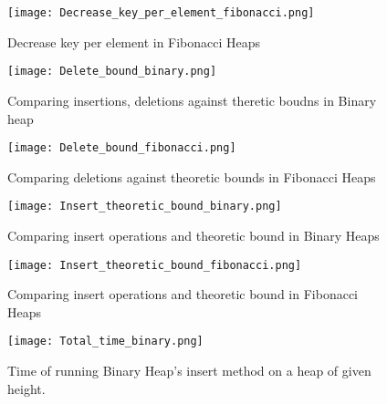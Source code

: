 \documentclass[a4paper,10pt]{article}
\begin{document}
\begin{figure}[h]
    \label{deckeyperelmfib}
  \texttt{[image: Decrease\_key\_per\_element\_fibonacci.png]}
  \caption{Decrease key per element in Fibonacci Heaps}
\end{figure}

\begin{figure}[h]
    \label{delboundbin}
  \texttt{[image: Delete\_bound\_binary.png]}
  \caption{Comparing insertions, deletions against theretic boudns in Binary heap}
\end{figure}

\begin{figure}[h]
    \label{delboundfib}
  \texttt{[image: Delete\_bound\_fibonacci.png]}
  \caption{Comparing deletions against theoretic bounds in Fibonacci Heaps}
\end{figure}

\begin{figure}[h]
    \label{instheoreticboundbin}
  \texttt{[image: Insert\_theoretic\_bound\_binary.png]}
  \caption{Comparing insert operations and theoretic bound in Binary Heaps}
\end{figure}

\begin{figure}[h]
    \label{instheoreticboundfib}
  \texttt{[image: Insert\_theoretic\_bound\_fibonacci.png]}
  \caption{Comparing insert operations and theoretic bound in Fibonacci Heaps}
\end{figure}

\begin{figure}[h]
    \label{timeinsbin}
  \texttt{[image: Total\_time\_binary.png]}
  \caption{Time of running Binary Heap's insert method on a heap of given height.}
\end{figure}
\end{document}
